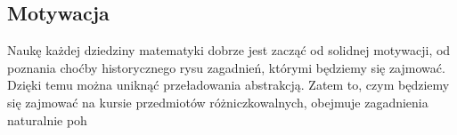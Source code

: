 \subsection{Motywacja}
Naukę każdej dziedziny matematyki dobrze jest zacząć od solidnej motywacji, od poznania choćby historycznego rysu zagadnień, którymi będziemy się zajmować. Dzięki temu można uniknąć przeładowania abstrakcją. Zatem to, czym będziemy się zajmować na kursie przedmiotów różniczkowalnych, obejmuje zagadnienia naturalnie poh

